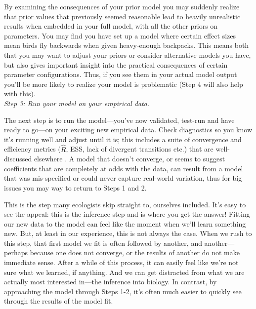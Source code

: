 \documentclass[11pt]{article}
\begin{document}
By examining the consequences of your prior model you may suddenly realize that prior values that previously seemed reasonable lead to heavily unrealistic results when embedded in your full model, with all the other priors on parameters. You may find you have set up a model where certain effect sizes mean birds fly backwards when given heavy-enough backpacks. This means both that you may want to adjust your priors or consider alternative models you have, but also gives important insight into the practical consequences of certain parameter configurations. Thus, if you see them in your actual model output you'll be more likely to realize your model is problematic (Step 4 will also help with this).\\

 \emph{Step 3: Run your model on your empirical data.} 
 
The next step is to run the model---you've now validated, test-run and have ready to go---on your exciting new empirical data. Check diagnostics so you know it's running well and adjust until it is; this includes a suite of convergence and efficiency metrics ($\hat{R}$, ESS, lack of divergent transitions etc.) that are well-discussed elsewhere \citep[and not our focus here, see instead][]{betanworkflow,gelman2020bayesian,vandeschoot2021,gabryvis}. A model that doesn't converge, or seems to suggest coefficients that are completely at odds with the data, can result from a model that was mis-specified or could never capture real-world variation, thus for big issues you may way to return to  Steps 1 and 2.
 
This is the step many ecologists skip straight to, ourselves included. It's easy to see the appeal: this is the inference step and is where you get the answer! Fitting our new data to the model can feel like the moment when we'll learn something new. But, at least in our experience, this is not always the case. When we rush to this step, that first model we fit is often followed by another, and another---perhaps because one does not converge, or the results of another do not make immediate sense. After a while of this process, it can easily feel like we're not sure what we learned, if anything. And we can get distracted from what we are actually most interested in---the inference into biology. In contrast, by approaching the model through Steps 1-2, it's often much easier to quickly see through the results of the model fit. 
\end{document}

